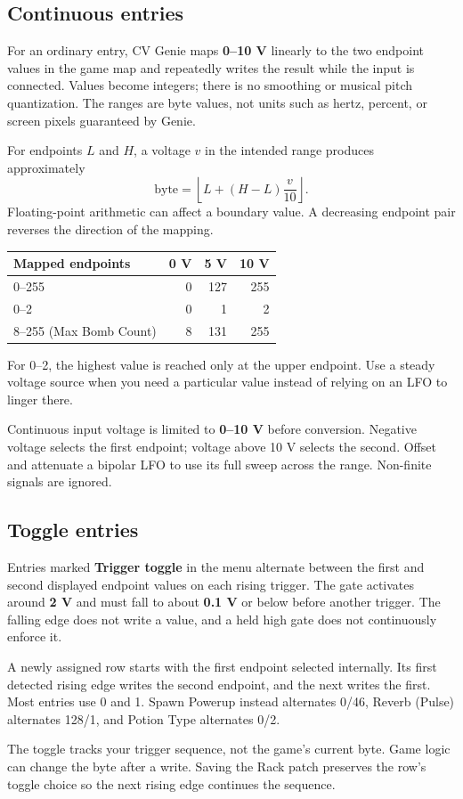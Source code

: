 \subsection{Continuous entries}
For an ordinary entry, CV Genie maps \textbf{0--10 V} linearly to the two
endpoint values in the game map and repeatedly writes the result while the
input is connected. Values become integers; there is no smoothing or
musical pitch quantization. The ranges are byte values, not units such as
hertz, percent, or screen pixels guaranteed by Genie.

For endpoints $L$ and $H$, a voltage $v$ in the intended range produces
approximately
\[
\text{byte}=\left\lfloor L+(H-L)\frac{v}{10}\right\rfloor.
\]
Floating-point arithmetic can affect a boundary value. A decreasing endpoint
pair reverses the direction of the mapping.

\begin{center}
\begin{tabular}{@{}lrrr@{}}
\toprule
\textbf{Mapped endpoints} & \textbf{0 V} & \textbf{5 V} & \textbf{10 V} \\
\midrule
0--255 & 0 & 127 & 255 \\
0--2 & 0 & 1 & 2 \\
8--255 (Max Bomb Count) & 8 & 131 & 255 \\
\bottomrule
\end{tabular}
\end{center}
For 0--2, the highest value is reached only at the upper endpoint. Use a
steady voltage source when you need a particular value instead of relying
on an LFO to linger there.

Continuous input voltage is limited to \textbf{0--10 V} before conversion.
Negative voltage selects the first endpoint; voltage above 10 V selects the
second. Offset and attenuate a bipolar LFO to use its full sweep across the
range. Non-finite signals are ignored.

\subsection{Toggle entries}
Entries marked \textbf{Trigger toggle} in the menu alternate between the
first and second displayed endpoint values on each rising trigger. The gate
activates around
\textbf{2 V} and must fall to about \textbf{0.1 V} or below before another
trigger. The falling edge does not write a value, and a held high gate does
not continuously enforce it.

A newly assigned row starts with the first endpoint selected internally. Its
first detected rising edge writes the second endpoint, and the next writes
the first. Most entries use 0 and 1. Spawn Powerup instead alternates 0/46, Reverb (Pulse) alternates 128/1,
and Potion Type alternates 0/2.

The toggle tracks your trigger sequence, not the game's current byte. Game
logic can change the byte after a write. Saving the Rack patch preserves the
row's toggle choice so the next rising edge continues the sequence.
